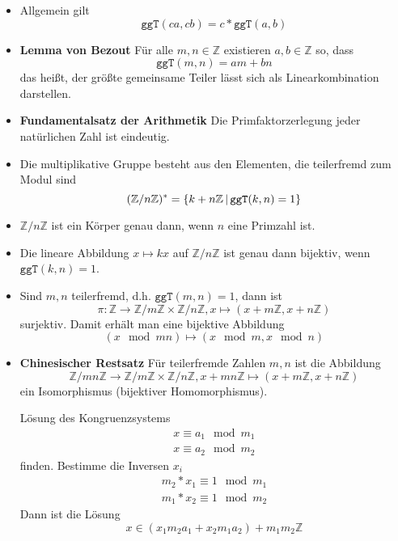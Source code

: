 \documentclass[landscape, 8pt, a4paper]{extarticle}
\newcommand{\ggT}{\texttt{ggT}}
\newcommand{\Z}{\mathbb{Z}}
\newcommand{\set}[2]{\ensuremath\left\{ #1 \,\middle|\, #2 \right\}}
\begin{document}
\begin{multicols}{3}
\begin{itemize}
		\item Allgemein gilt
		\begin{equation*}
			\ggT(ca,cb)=c*\ggT(a,b)
		\end{equation*}
		\item \textbf{Lemma von Bezout}
		Für alle $m,n\in\Z$ existieren $a,b\in\Z$ so, dass
		\begin{equation*}
			\ggT(m,n)=am+bn
		\end{equation*}
		das heißt, der größte gemeinsame Teiler lässt sich als Linearkombination darstellen.
		\item \textbf{Fundamentalsatz der Arithmetik} Die Primfaktorzerlegung jeder natürlichen Zahl ist eindeutig.
		\item Die multiplikative Gruppe besteht aus den Elementen, die teilerfremd zum Modul sind
		\begin{equation*}
			(\Z/n\Z)^\ast =\set{k+n\Z}{\ggT(k,n)=1}
		\end{equation*}
		\item $\Z/n\Z$ ist ein Körper genau dann, wenn $n$ eine Primzahl ist.

		\item Die lineare Abbildung $x\mapsto kx$ auf $\Z/n\Z$ ist genau dann bijektiv, wenn $\ggT(k,n)=1$.
		
		\item Sind $m,n$ teilerfremd, d.h. $\ggT(m,n)=1$, dann ist
		\begin{equation*}
			\pi:\Z\rightarrow\Z/m\Z\times\Z/n\Z, x\mapsto(x+m\Z,x+n\Z)
		\end{equation*}
		surjektiv. Damit erhält man eine bijektive Abbildung
		\begin{equation*}
			(x\mod mn)\mapsto (x\mod m,x\mod n)
		\end{equation*}
		\item \textbf{Chinesischer Restsatz}
		Für teilerfremde Zahlen $m,n$ ist die Abbildung
		\begin{equation*}
			\Z/mn\Z\rightarrow \Z/m\Z\times \Z/n\Z, 
			x+mn\Z\mapsto (x+m\Z,x+n\Z)
		\end{equation*}
		ein Isomorphismus (bijektiver Homomorphismus).

		Lösung des Kongruenzsystems
		\begin{align*}
			x\equiv a_1\mod m_1\\
			x\equiv a_2\mod m_2
		\end{align*}
		finden. Bestimme die Inversen $x_i$
		\begin{align*}
			m_2*x_1\equiv 1 \mod m_1\\
			m_1*x_2\equiv 1 \mod m_2
		\end{align*}
		Dann ist die Lösung
		\begin{equation*}
			x\in (x_1m_2a_1+x_2m_1a_2)+m_1m_2\Z
		\end{equation*}


\end{itemize}
\end{multicols}
\end{document}
